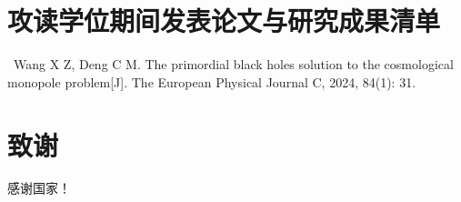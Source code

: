 \documentclass[UTF8,12pt,AutoFakeBold]{ctexart}
\begin{document}
	\section*{攻读学位期间发表论文与研究成果清单}

	\noindent[1]\ Wang X Z, Deng C M. The primordial black holes solution to the cosmological monopole problem[J]. The European Physical Journal C, 2024, 84(1): 31.
	\pagebreak
	\section*{致谢}
	\fangsong
	感谢国家！
\end{document}
